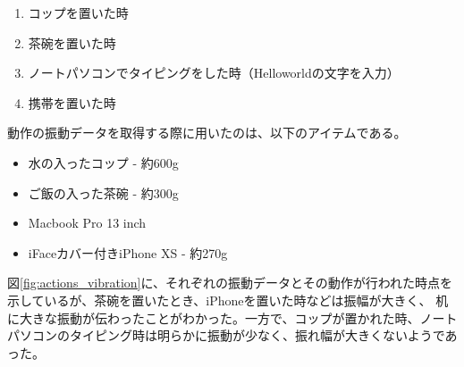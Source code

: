 \begin{enumerate}
  \item コップを置いた時
  \item 茶碗を置いた時
  \item ノートパソコンでタイピングをした時（Helloworldの文字を入力）
  \item 携帯を置いた時
\end{enumerate}

動作の振動データを取得する際に用いたのは、以下のアイテムである。

\begin{itemize}
  \item 水の入ったコップ - 約600g
  \item ご飯の入った茶碗 - 約300g
  \item Macbook Pro 13 inch
  \item iFaceカバー付きiPhone XS - 約270g
\end{itemize}

図\ref{fig:actions_vibration}に、それぞれの振動データとその動作が行われた時点を示しているが、茶碗を置いたとき、iPhoneを置いた時などは振幅が大きく、
机に大きな振動が伝わったことがわかった。一方で、コップが置かれた時、ノートパソコンのタイピング時は明らかに振動が少なく、振れ幅が大きくないようであった。


